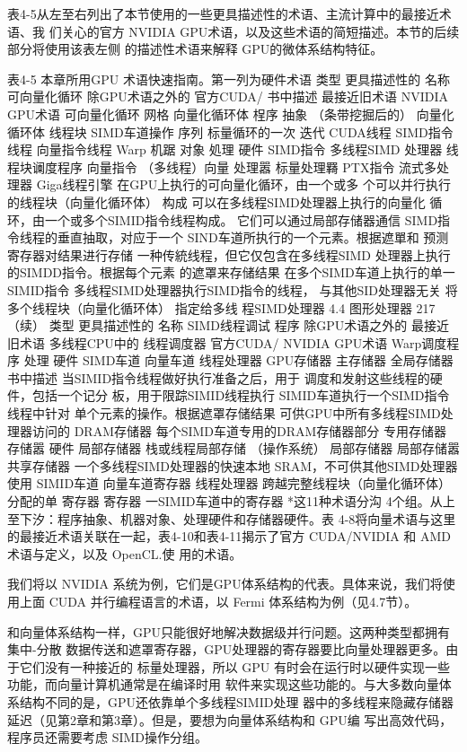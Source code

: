 表4-5从左至右列出了本节使用的一些更具描述性的术语、主流计算中的最接近术语、我
们关心的官方 NVIDIA GPU术语，以及这些术语的简短描述。本节的后续部分将使用该表左侧
的描述性术语来解释 GPU的微体系结构特征。

表4-5 本章所用GPU 术语快速指南。第一列为硬件术语
类型
更具描述性的
名称
可向量化循环
除GPU术语之外的
官方CUDA/
书中描述
最接近旧术语
NVIDIA GPU术语
可向量化循环
网格
向量化循环体
桯序
抽象
（条带挖掘后的）
向量化循环体
线程块
SIMD车道操作
序列
标量循环的一次
迭代
CUDA线程
SIMD指令线程
向量指令线程
Warp
机踞
对象
処理
硬件
SIMD指令
多线程SIMD
处理器
线程块谰度程序
向量指令
（多线程）向量
处理嚣
标量处理羇
PTX指令
流式多处理器
Giga线程引擎
在GPU上执行的可向量化循环，由一个或多
个可以并行执行的线程块（向量化循环体）
构成
可以在多线程SIMD处理器上执行的向量化
循环，由一个或多个SIMID指令线程构成。
它们可以通过局部存储器通信
SIMD指令线程的垂直抽取，对应于一个
SIND车道所执行的一个元素。根据遮單和
预测寄存器对结果进行存储
一种传統线程，但它仅包含在多线程SIMD
处理器上执行的SIMDD指令。根据每个元素
的遮罩来存储结果
在多个SIMD车道上执行的单一SIMID指令
多线程SIMD处理器执行SIMD指令的线程，
与其他SID处理器无关
将多个线程块（向量化循环体） 指定给多线
程SIMD处理器
4.4 图形处理器
217
（续）
类型
更具描述性的
名称
SIMD线程调试
程序
除GPU术语之外的
最接近旧术语
多线程CPU中的
线程调度器
官方CUDA/
NVIDIA GPU术语
Warp调度程序
处理
硬件
SIMD车道
向量车道
线程处理器
GPU存储器
主存储器
全局存储器
书中描述
当SIMID指令线程做好执行准备之后，用于
调度和发射这些线程的硬件，包括一个记分
板，用于限踪SIMID线程执行
SIMID车道执行一个SIMD指令线程中针对
单个元素的操作。根据遮罩存储结果
可供GPU中所有多线程SIMD处理器访问的
DRAM存储器
每个SIMD车道专用的DRAM存储器部分
专用存储器
存储嚣
硬件
局部存储器
栈或线程局部存储
（操作系统）
局部存储器
局部存储嚣
共享存储器
一个多线程SIMD处理器的快速本地
SRAM，不可供其他SIMD处理器使用
SIMID车道
向量车道寄存器
线程处理器
跨越完整线程块（向量化循环体）分配的单
寄存器
寄存器
一SIMID车道中的寄存器
*这11种术语分沟 4个组。从上至下汐：程序抽象、机器对象、处理硬件和存储器硬件。表 4-8将向量术语与这里
的最接近术语关联在一起，表4-10和表4-11揭示了官方 CUDA/NVIDIA 和 AMD 术语与定义，以及 OpenCL.使
用的术语。

我们将以 NVIDIA 系统为例，它们是GPU体系结构的代表。具体来说，我们将使用上面
CUDA 并行编程语言的术语，以 Fermi 体系结构为例（见4.7节）。

和向量体系结构一样，GPU只能很好地解决数据级并行问题。这两种类型都拥有集中-分散
数据传送和遮罩寄存器，GPU处理器的寄存器要比向量处理器更多。由于它们没有一种接近的
标量处理器，所以 GPU 有时会在运行时以硬件实现一些功能，而向量计算机通常是在编译时用
软件来实现这些功能的。与大多数向量体系结构不同的是，GPU还依靠单个多线程SIMID处理
器中的多线程来隐藏存储器延迟（见第2章和第3章）。但是，要想为向量体系结构和 GPU编
写出高效代码，程序员还需要考虑 SIMD操作分组。

